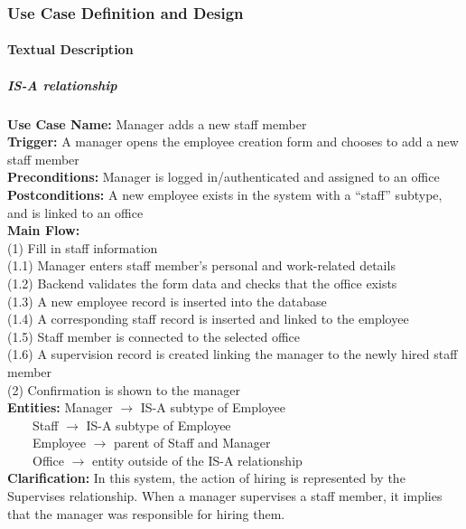 \documentclass[a4paper, 11pt]{article}          %
\begin{document}
\subsubsection{Use Case Definition and Design}

\paragraph*{Textual Description}
\subparagraph*{IS-A relationship}
\noindent
\textbf{Use Case Name:} Manager adds a new staff member
\\
\textbf{Trigger:} A manager opens the employee creation form and chooses to add a new staff member
\\
\textbf{Preconditions:} Manager is logged in/authenticated and assigned to an office
\\
\textbf{Postconditions:} A new employee exists in the system with a “staff” subtype, and is linked to an office
\\
\textbf{Main Flow:} 
\\
\indent
(1) Fill in staff information
\\
\indent\indent
(1.1) Manager enters staff member’s personal and work-related details
\\
\indent\indent
(1.2) Backend validates the form data and checks that the office exists
\\
\indent\indent
(1.3) A new employee record is inserted into the database
\\
\indent\indent
(1.4) A corresponding staff record is inserted and linked to the employee
\\
\indent\indent
(1.5) Staff member is connected to the selected office
\\
\indent\indent
(1.6) A supervision record is created linking the manager to the newly hired staff member
\\
\indent
(2) Confirmation is shown to the manager
\\
\textbf{Entities:} Manager $\to$ IS-A subtype of Employee
\\
\indent\indent
~~~~Staff $\to$ IS-A subtype of Employee
\\
\indent\indent
~~~~Employee $\to$ parent of Staff and Manager
\\
\indent\indent
~~~~Office $\to$ entity outside of the IS-A relationship
\\
\textbf{Clarification:} In this system, the action of hiring is represented by the Supervises relationship. When a manager supervises a staff member, it implies that the manager was responsible for hiring them.
\end{document}
